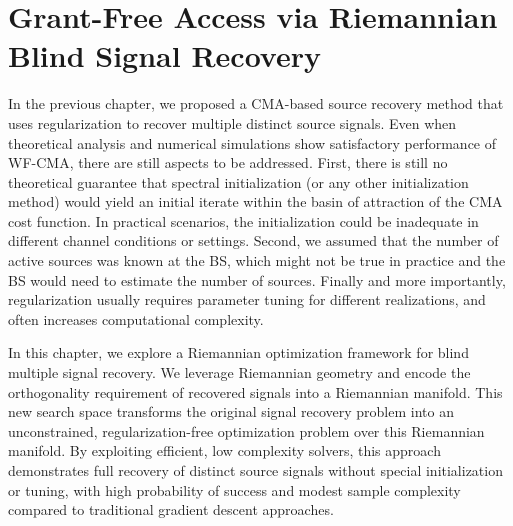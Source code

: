 \chapter{Grant-Free Access via Riemannian Blind Signal Recovery} \label{rocma:chap}


In the previous chapter, we proposed a CMA-based source recovery method that uses regularization to recover multiple distinct source signals. 
Even when theoretical analysis and numerical simulations show satisfactory performance of WF-CMA, there are still aspects to be addressed.
First, there is still no theoretical guarantee that spectral initialization (or any other initialization method) would yield an initial iterate within the basin of attraction of the CMA cost function. In practical scenarios, the initialization could be inadequate in different channel conditions or settings. 
Second, we assumed that the number of active sources was known at the BS, which might not be true in practice and the BS would need to estimate the number of sources. 
Finally and more importantly, regularization usually requires parameter tuning for different realizations, and often increases computational complexity.  




In this chapter, we explore a Riemannian optimization framework for blind multiple signal recovery. 
We leverage Riemannian geometry and encode the orthogonality requirement of recovered signals into a Riemannian manifold. This new search space transforms the original signal recovery problem into an unconstrained, regularization-free optimization problem over this Riemannian manifold. By exploiting efficient, low complexity solvers, this approach demonstrates full recovery of distinct source signals without special initialization or tuning, with high probability of success and modest sample complexity compared to traditional gradient descent approaches.


